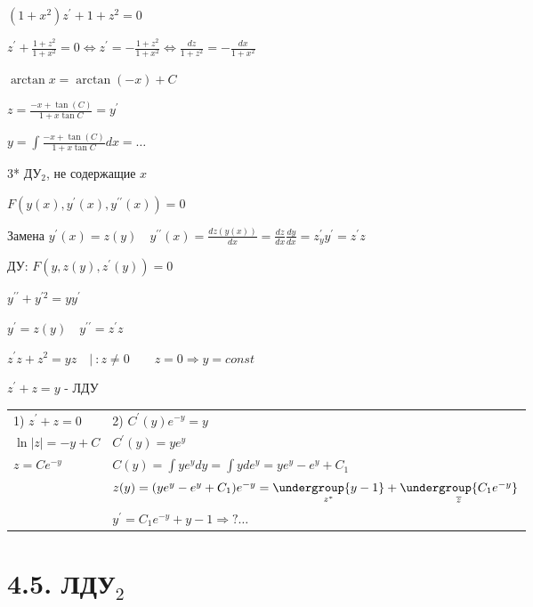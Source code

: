 \documentclass[12pt]{article}
\begin{document}
    $(1 + x^2)z^\prime + 1 + z^2 = 0$

    $z^\prime + \frac{1 + z^2}{1 + x^2} = 0 \Longleftrightarrow z^\prime = -\frac{1 + z^2}{1 + x^2} \Longleftrightarrow \frac{dz}{1 + z^2} = -\frac{dx}{1 + x^2}$

    $\arctan x = \arctan(-x) + C$

    $z = \frac{-x + \tan(C)}{1 + x \tan C} = y^\prime$

    $y = \int \frac{-x + \tan(C)}{1 + x \tan C} dx = \dots $

    3* ДУ$_2$, не содержащие $x$

    $F(y(x), y^\prime(x), y^{\prime\prime}(x)) = 0$

    Замена $y^\prime(x) = z(y) \quad y^{\prime\prime}(x) = \frac{dz(y(x))}{dx} = \frac{dz}{dx} \frac{dy}{dx} = z^\prime_y y^\prime = z^\prime z$

    ДУ: $F(y, z(y), z^\prime(y)) = 0$

    \Ex $y^{\prime\prime} + y^{\prime 2} = yy^\prime$

    $y^\prime = z(y) \quad y^{\prime\prime} = z^\prime z$

    $z^\prime z + z^2 = yz \quad | \ : z \neq 0 \quad\quad z = 0 \Longrightarrow y = const$

    $z^\prime + z = y$ - ЛДУ

    \begin{tabular}{p{5cm}p{10cm}}
        1) $z^\prime + z = 0$ & 2) $C^\prime (y) e^{-y} = y$                                                                                              \\

        $\ln|z| = -y + C$     & $C^\prime (y) = ye^{y}$                                                                                                   \\

        $z = Ce^{-y}$         & $C(y) = \int y e^y dy = \int y de^y = ye^y - e^y + C_1$                                                                   \\

        & $z(y) = (ye^y - e^y + C_1)e^{-y} = \underset{z^*}{\undergroup{y - 1}} + \underset{\overline{z}}{\undergroup{C_1 e^{-y}}}$ \\

        & $y^\prime = C_1 e^{-y} + y - 1 \Longrightarrow ? \dots $

    \end{tabular}


    \section{4.5. ЛДУ$_2$}
\end{document}
